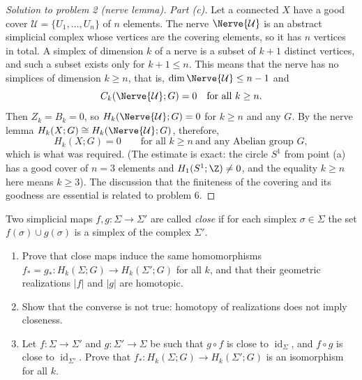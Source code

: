 \documentclass[a4paper,12pt]{report}
\begin{document}
\begin{proof}[Solution to problem \textup{2} \textup{(}nerve lemma\textup{)}]
\textit{Part \textup{(c)}.} Let a connected $X$ have a good cover $\mathcal U=\{U_1,\dots,U_n\}$ of $n$ elements. The nerve $\Nerve{\mathcal U}$ is an abstract simplicial complex whose vertices are the covering elements, so it has $n$ vertices in total. A simplex of dimension $k$ of a nerve is a subset of $k+1$ distinct vertices, and such a subset exists only for $k+1\le n$. This means that the nerve has no simplices of dimension $k\ge n$, that is, $\dim\Nerve{\mathcal U}\le n-1$ and
\[
C_k(\Nerve{\mathcal U};G)=0\quad\text{for all } k\ge n .
\]
Then $Z_k=B_k=0$, so $H_k(\Nerve{\mathcal U};G)=0$ for $k\ge n$ and any $G$. By the nerve lemma $H_k(X;G)\cong H_k(\Nerve{\mathcal U};G)$, therefore,
\[
H_k(X;G)=0\qquad\text{for all } k\ge n\ \text{and any Abelian group } G ,
\]
which is what was required. \textup{(}The estimate is exact: the circle $S^1$ from point \textup{(a)} has a good cover of $n=3$ elements and $H_1(S^1;\Z)\ne0$, and the equality $k\ge n$ here means $k\ge3$\textup{)}. The discussion that the finiteness of the covering and its goodness are essential is related to problem \textup{6}.
\end{proof}
\begin{task}
Two simplicial maps $f, g \colon \Sigma \to \Sigma'$ are called \emph{close} if for each simplex $\sigma \in \Sigma$ the set $f(\sigma) \cup g(\sigma)$ is a simplex of the complex $\Sigma'$.
\begin{enumerate}[label=\textup{(\alph*)}]
\item Prove that close maps induce the same homomorphisms $f_* = g_* \colon H_k(\Sigma; G) \to H_k(\Sigma'; G)$ for all $k$, and that their geometric realizations $|f|$ and $|g|$ are homotopic.
\item Show that the converse is not true\textup{:} homotopy of realizations does not imply closeness. 
\item Let $f \colon \Sigma \to \Sigma'$ and $g \colon \Sigma' \to \Sigma$ be such that $g \circ f$ is close to $\operatorname{id}_\Sigma$, and $f \circ g$ is close to $\operatorname{id}_{\Sigma'}$. Prove that $f_* \colon H_k(\Sigma; G) \to H_k(\Sigma'; G)$ is an isomorphism for all $k$.
\end{enumerate}
\end{task}
\end{document}
